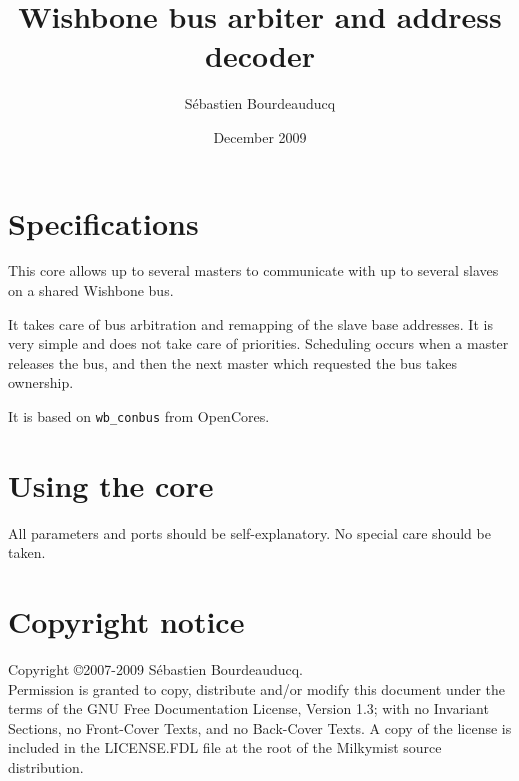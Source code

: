 \documentclass[a4paper,11pt]{article}
\title{Wishbone bus arbiter and address decoder}
\author{S\'ebastien Bourdeauducq}
\date{December 2009}
\begin{document}
\setlength{\parindent}{0pt}
\setlength{\parskip}{5pt}
\maketitle{}
\section{Specifications}
This core allows up to several masters to communicate with up to several slaves on a shared Wishbone bus.

It takes care of bus arbitration and remapping of the slave base addresses. It is very simple and does not take care of priorities. Scheduling occurs when a master releases the bus, and then the next master which requested the bus takes ownership.

It is based on \verb!wb_conbus! from OpenCores.

\section{Using the core}
All parameters and ports should be self-explanatory. No special care should be taken.

\section*{Copyright notice}
Copyright \copyright 2007-2009 S\'ebastien Bourdeauducq. \\
Permission is granted to copy, distribute and/or modify this document under the terms of the GNU Free Documentation License, Version 1.3; with no Invariant Sections, no Front-Cover Texts, and no Back-Cover Texts. A copy of the license is included in the LICENSE.FDL file at the root of the Milkymist source distribution.
\end{document}
